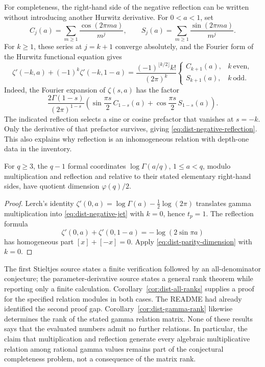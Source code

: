 For completeness, the right-hand side of the negative reflection
can be written without introducing another Hurwitz derivative.
For \(0<a<1\), set
\[
 C_j(a)=\sum_{m\geq1}\frac{\cos(2\pi ma)}{m^j},
 \qquad
 S_j(a)=\sum_{m\geq1}\frac{\sin(2\pi ma)}{m^j}.
\]
For \(k\geq1\), these series at \(j=k+1\) converge absolutely, and
the Fourier form of the Hurwitz functional equation \cite{DLMF}
gives
\begin{equation}
 \zeta'(-k,a)+(-1)^k\zeta'(-k,1-a)
 =\frac{(-1)^{\lfloor k/2\rfloor}k!}{(2\pi)^k}
 \begin{cases}
 C_{k+1}(a),&k\ \text{even},\\
 S_{k+1}(a),&k\ \text{odd}.
 \end{cases}
 \label{eq:dist-negative-reflection}
\end{equation}
Indeed, the Fourier expansion of \(\zeta(s,a)\) has the factor
\[
 \frac{2\Gamma(1-s)}{(2\pi)^{1-s}}
 \left(\sin\frac{\pi s}{2}\,C_{1-s}(a)
       +\cos\frac{\pi s}{2}\,S_{1-s}(a)\right).
\]
The indicated reflection selects a sine or cosine prefactor
that vanishes at \(s=-k\). Only the derivative of that prefactor
survives, giving \eqref{eq:dist-negative-reflection}.
This also explains why reflection is an inhomogeneous relation
with depth-one data in the inventory.

\begin{corollary}
\label{cor:dist-gamma-rank}
For \(q\geq3\), the \(q-1\) formal coordinates
\(\log\Gamma(a/q)\), \(1\leq a<q\), modulo multiplication and
reflection and relative to their stated elementary right-hand
sides, have quotient dimension \(\varphi(q)/2\).
\end{corollary}

\begin{proof}
Lerch's identity
\(\zeta'(0,a)=\log\Gamma(a)-\tfrac12\log(2\pi)\)
translates gamma multiplication into
\eqref{eq:dist-negative-jet} with \(k=0\), hence \(t_p=1\).
The reflection formula
\[
 \zeta'(0,a)+\zeta'(0,1-a)=-\log(2\sin\pi a)
\]
has homogeneous part \([x]+[-x]=0\). Apply
\eqref{eq:dist-parity-dimension} with \(k=0\).
\end{proof}

\begin{remark}
\label{rem:dist-formal-only}
The first Stieltjes source states a finite verification followed
by an all-denominator conjecture; the parameter-derivative source
states a general rank theorem while reporting only a finite
calculation. Corollary~\ref{cor:dist-all-ranks} supplies a proof
for the specified relation modules in both cases. The README
had already identified the second proof gap.
Corollary~\ref{cor:dist-gamma-rank} likewise determines the rank
of the stated gamma relation matrix. None of these results says
that the evaluated numbers admit no further relations.
In particular, the claim that multiplication and reflection
generate every algebraic multiplicative relation among rational
gamma values remains part of the conjectural completeness
problem, not a consequence of the matrix rank.
\end{remark}

